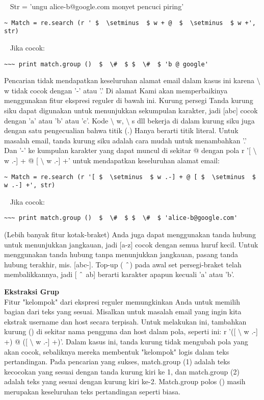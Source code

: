 \begin {enumerate}
\begin {enumerate}
~ Str = 'ungu alice-b@google.com monyet pencuci piring'

\verb|~ Match = re.search (r ' $  \setminus  $ w + @  $  \setminus  $ w +', str)|

~ Jika cocok:

\verb|~~~ print match.group ()  $  \#  $ $  \#  $ 'b @ google'|

Pencarian tidak mendapatkan keseluruhan alamat email dalam kasus ini karena  $  \setminus  $ w tidak cocok dengan '-' atau '.' Di alamat Kami akan memperbaikinya menggunakan fitur ekspresi reguler di bawah ini. Kurung persegi Tanda kurung siku dapat digunakan untuk menunjukkan sekumpulan karakter, jadi [abc] cocok dengan 'a' atau 'b' atau 'c'. Kode  $  \setminus  $ w,  $  \setminus  $ s dll bekerja di dalam kurung siku juga dengan satu pengecualian bahwa titik (.) Hanya berarti titik literal. Untuk masalah email, tanda kurung siku adalah cara mudah untuk menambahkan '.' Dan '-' ke kumpulan karakter yang dapat muncul di sekitar @ dengan pola r '[ $  \setminus  $ w .-] + @ [ $  \setminus  $ w .-] +' untuk mendapatkan keseluruhan alamat email:

\verb|~ Match = re.search (r '[ $  \setminus  $ w .-] + @ [ $  \setminus  $ w .-] +', str)|

~ Jika cocok:

\verb|~~~ print match.group ()  $  \#  $ $  \#  $ 'alice-b@google.com'|

(Lebih banyak fitur kotak-braket) Anda juga dapat menggunakan tanda hubung untuk menunjukkan jangkauan, jadi [a-z] cocok dengan semua huruf kecil. Untuk menggunakan tanda hubung tanpa menunjukkan jangkauan, pasang tanda hubung terakhir, mis. [abc-]. Top-up ( $  \string^  $) pada awal set persegi-braket telah membalikkannya, jadi [ $  \string^  $ ab] berarti karakter apapun kecuali 'a' atau 'b'.

{\fontsize{14pt}{14pt}\selectfont \textbf{Ekstraksi Grup} \\}
Fitur "kelompok" dari ekspresi reguler memungkinkan Anda untuk memilih bagian dari teks yang sesuai. Misalkan untuk masalah email yang ingin kita ekstrak username dan host secara terpisah. Untuk melakukan ini, tambahkan kurung () di sekitar nama pengguna dan host dalam pola, seperti ini: r '([ $  \setminus  $ w .-] +) @ ([ $  \setminus  $ w .-] +)'. Dalam kasus ini, tanda kurung tidak mengubah pola yang akan cocok, sebaliknya mereka membentuk "kelompok" logis dalam teks pertandingan. Pada pencarian yang sukses, match.group (1) adalah teks kecocokan yang sesuai dengan tanda kurung kiri ke 1, dan match.group (2) adalah teks yang sesuai dengan kurung kiri ke-2. Match.group polos () masih merupakan keseluruhan teks pertandingan seperti biasa.


\end{enumerate}
\end{enumerate}
